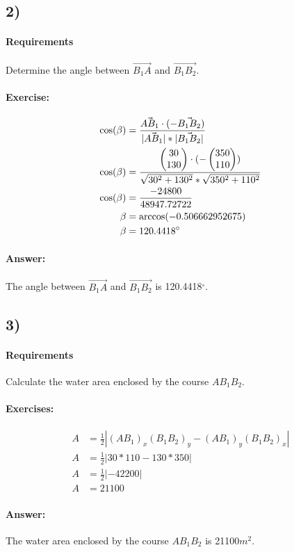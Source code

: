 \subsection{2)}
\paragraph{Requirements}
Determine the angle between $\vec{B_1A}$ and $\vec{B_1B_2}$.

\paragraph{Exercise:}
\begin{align}
    \cos(\beta) &= \frac{\vec{AB_1} \cdot (-\vec{B_1B_2})}{|\vec{AB_1}| * |\vec{B_1B_2}|} \\
    \cos(\beta) &= \frac{\begin{pmatrix} 30 \\ 130 \end{pmatrix} \cdot (-\begin{pmatrix} 350 \\ 110 \end{pmatrix})}{\sqrt{30^2 + 130^2} * \sqrt{350^2 + 110^2}} \\
    \cos(\beta) &= \frac{-24800}{48947.72722} \\
    \beta &= \arccos(-0.506662952675) \\
    \beta &= 120.4418^\circ
\end{align}

\paragraph{Answer:}
The angle between $\vec{B_1A}$ and $\vec{B_1B_2}$ is 120.4418$^\circ$.

\subsection{3)}
\paragraph{Requirements}
Calculate the water area enclosed by the course $AB_1B_2$.

\paragraph{Exercises:}
\begin{align}
    A &= \frac12|( AB_1 )_x( B_1B_2 )_y - ( AB_1 )_y( B_1B_2 )_x| \\ 
   A &= \frac{1}{2}|30*110-130*350| \\ 
   A &= \frac{1}{2}|-42200| \\ 
   A &= 21100
\end{align}

\paragraph{Answer:}
The water area enclosed by the course $AB_1B_2$ is 21100$m^2$.
